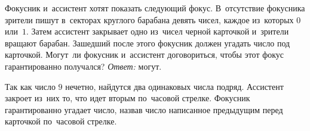 \problem
Фокусник и~ассистент хотят показать следующий фокус.
В~отсутствие фокусника зрители пишут в~секторах круглого барабана девять чисел,
каждое из~которых $0$ или~$1$.
Затем ассистент закрывает одно из~чисел черной карточкой и~зрители вращают
барабан.
Зашедший после этого фокусник должен угадать число под карточкой.
Могут~ли фокусник и~ассистент договориться, чтобы этот фокус гарантированно
получался? 
\solution
\emph{Ответ:} могут.
\par
Так как число $9$ нечетно, найдутся два одинаковых числа подряд.
Ассистент закроет из~них то, что идет вторым по~часовой стрелке.
Фокусник гарантированно угадает число, назвав число написанное предыдущим перед
карточкой по~часовой стрелке.
\endproblem
